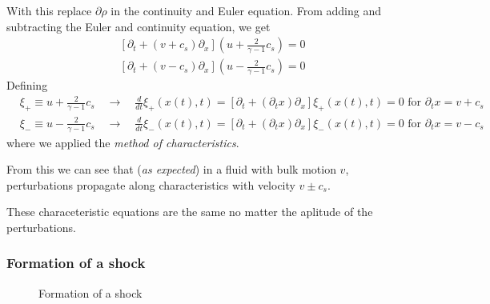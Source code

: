 With this replace $\partial \rho$ in the continuity and Euler equation. From adding
and subtracting the Euler and continuity equation, we get
\begin{equation}
    \begin{aligned}
        &\left[\partial_t+\left(v+c_{s}\right) \partial_x\right]\left(u+\frac{2}{\gamma-1} c_{s}\right)=0\\
        &\left[\partial_t+\left(v-c_{s}\right) \partial_x\right]\left(u-\frac{2}{\gamma-1} c_{s}\right)=0
    \end{aligned}
\end{equation}
Defining
\begin{equation}
    \begin{aligned}
        &\xi_{+} \equiv u+\frac{2}{\gamma-1} c_{s} \quad \rightarrow \quad \frac{d}{dt} \xi_{+}(x(t),t) = \left[ \partial_t + (\partial_t x) \partial_x \right] \xi_{+}(x(t),t) = 0 \text{ for } \partial_t x = v + c_s\\
        &\xi_{-} \equiv u-\frac{2}{\gamma-1} c_{s} \quad \rightarrow \quad \frac{d}{dt} \xi_{-}(x(t),t) = \left[ \partial_t + (\partial_t x) \partial_x \right] \xi_{-}(x(t),t) = 0 \text{ for } \partial_t x = v - c_s
    \end{aligned}
\end{equation}
where we applied the \textit{method of characteristics}.
\par
\begin{mdframed}[style = padded]
    From this we can see that (\textit{as expected}) in a fluid with bulk motion $v$, perturbations propagate along characteristics with velocity $v \pm c_s$.
\end{mdframed}

These characeteristic equations are the same no matter the aplitude of the perturbations.

\subsubsection{Formation of a shock}
\begin{figure}
    \centering
    
    \caption{Formation of a shock}
    \label{fig:shock_formation}
\end{figure}

